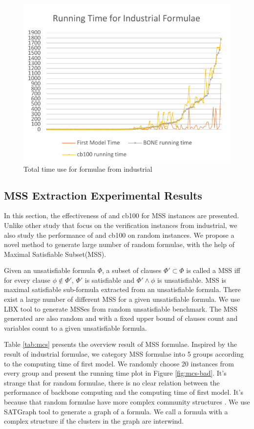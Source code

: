 \begin{figure}
    \centering
    \includegraphics[scale=0.7]{ind2.pdf}
   \caption{Total time use for formulae from industrial}
   \label{fig:ind-time}
\end{figure}

\subsection{MSS Extraction Experimental Results}
In this section, the effectiveness of \tool and cb100 for MSS instances are presented.
Unlike other study that focus on the verification instances from industrial, we also study the performance of \tool and cb100 on random instances.
We propose a novel method to generate large number of random formulae, with the help of Maximal Satisfiable Subset(MSS).

Given an unsatisfiable formula $\Phi$, a subset of clauses $\Phi'\subset\Phi$ is called a MSS iff for every clause $\phi\notin\Phi'$, $\Phi'$ is satisfiable and $\Phi'\wedge\phi$ is unsatisfiable. MSS is maximal satisfiable sub-formula extracted from an unsatisfiable formula. There exist a large number of different MSS for a given unsatisfiable formula. We use LBX tool to generate MSSes from random unsatisfiable benchmark. The MSS generated are also random and with a fixed upper bound of clauses count and variables count to a given unsatisfiable formula.

Table \ref{tab:mcs} presents the overview result of MSS formulae. Inspired by the result of industrial formulae, we category MSS formulae into 5 groups according to the computing time of first model. We randomly choose 20 instances from every group and present the running time plot in Figure \ref{fig:mcs-bad}. It's strange that for random formulae, there is no clear relation between the performance of backbone computing and the computing time of first model. It's because that random formulae have more complex community structures \cite{}. We use SATGraph \cite{} tool to generate a graph of a formula. We call a formula with a complex structure if the clusters in the graph are interwind.

